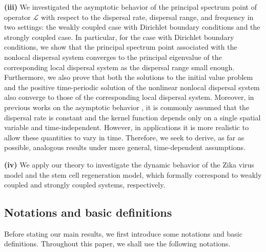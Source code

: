 \documentclass[11pt,reqno]{amsart}
\numberwithin{equation}{section}
\begin{document}
\textbf{(iii)} We investigated the asymptotic behavior of the principal spectrum point of operator $\mathcal{L}$ with respect to the dispersal rate, dispersal range, and frequency in two settings: the weakly coupled case with Dirichlet boundary conditions and the strongly coupled case. In particular, for the case with Dirichlet boundary conditions, we show that the principal spectrum point associated with the nonlocal dispersal system converges to the principal eigenvalue of the corresponding local dispersal system as the dispersal range small enough. Furthermore, we also prove that both the solutions to the initial value problem and the positive time-periodic solution of the nonlinear nonlocal dispersal system also converge to those of the corresponding local dispersal system.
Moreover, in previous works on the asymptotic behavior \cite{Feng,SX,ShenVo,LinWang,NV2}, it is commonly assumed that the dispersal rate is constant and the kernel function depends only on a single spatial variable and time-independent. However, in applications it is more realistic to allow these quantities to vary in time. Therefore, we seek to derive, as far as possible, analogous results under more general, time-dependent assumptions.

\textbf{(iv)} We apply our theory to investigate the dynamic behavior of the Zika virus model and the stem cell regeneration model, which formally correspond to weakly coupled and strongly coupled systems, respectively.

\subsection{Notations and basic definitions}
\indent


Before stating our main results, we first introduce some notations and basic definitions.
Throughout this paper, we shall use the following notations.
\end{document}
